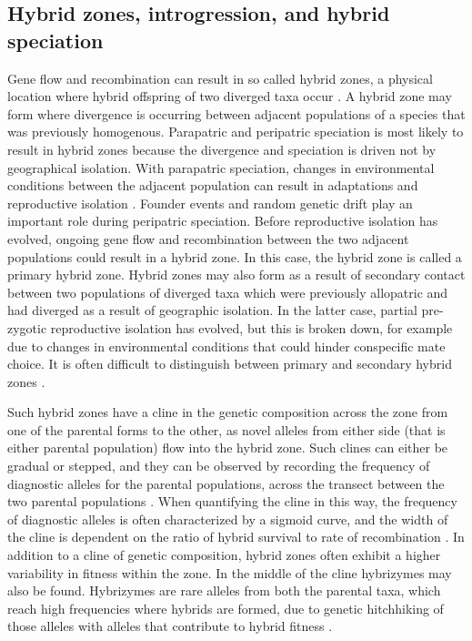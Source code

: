 \subsection{Hybrid zones, introgression, and hybrid speciation}
\label{sec:hzones}

Gene flow and recombination can result in so called hybrid zones, a physical location where hybrid offspring of two diverged taxa occur \parencite{Hewitt1985}.
A hybrid zone may form where divergence is occurring between adjacent populations of a species that was previously homogenous.
Parapatric and peripatric speciation is most likely to result in hybrid zones because the divergence and speciation is driven not by geographical isolation.
With parapatric speciation, changes in environmental conditions between the adjacent population can result in adaptations and reproductive isolation \parencite{Mayr1942}.
Founder events and random genetic drift play an important role during peripatric speciation.
Before reproductive isolation has evolved, ongoing gene flow and recombination between the two adjacent populations could result in a hybrid zone.
In this case, the hybrid zone is called a primary hybrid zone.
Hybrid zones may also form as a result of secondary contact between two populations of diverged taxa which were previously allopatric and had diverged as a result of geographic isolation.
In the latter case, partial pre-zygotic reproductive isolation has evolved, but this is broken down, for example due to changes in environmental conditions that could hinder conspecific mate choice.
It is often difficult to distinguish between primary and secondary hybrid zones \parencite{Endler1982}.

Such hybrid zones have a cline in the genetic composition across the zone from one of the parental forms to the other, as novel alleles from either side (that is either parental population) flow into the hybrid zone.
Such clines can either be gradual or stepped, and they can be observed by recording the frequency of diagnostic alleles for the parental populations, across the transect between the two parental populations \parencite{Hewitt1985}.
When quantifying the cline in this way, the frequency of diagnostic alleles is often characterized by a sigmoid curve, and the width of the cline is dependent on the ratio of hybrid survival to rate of recombination \parencite{Hewitt1985}.
In addition to a cline of genetic composition, hybrid zones often exhibit a higher variability in fitness within the zone.
In the middle of the cline hybrizymes may also be found.
Hybrizymes are rare alleles from both the parental taxa, which reach high frequencies where hybrids are formed, due to genetic hitchhiking of those alleles with alleles that contribute to hybrid fitness \parencite{Schilthuizen1999}. 


